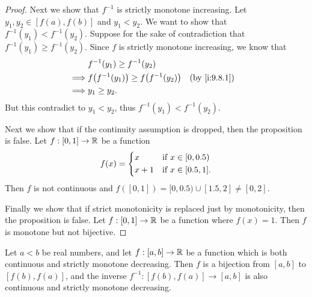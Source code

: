 \begin{proof}
  Next we show that \(f^{-1}\) is strictly monotone increasing.
  Let \(y_1, y_2 \in [f(a), f(b)]\) and \(y_1 < y_2\).
  We want to show that \(f^{-1}(y_1) < f^{-1}(y_2)\).
  Suppose for the sake of contradiction that \(f^{-1}(y_1) \geq f^{-1}(y_2)\).
  Since \(f\) is strictly monotone increasing, we know that
  \begin{align*}
             & f^{-1}(y_1) \geq f^{-1}(y_2)                                         \\
    \implies & f\big(f^{-1}(y_1)\big) \geq f\big(f^{-1}(y_2)\big) &  & \by{i:9.8.1} \\
    \implies & y_1 \geq y_2.
  \end{align*}
  But this contradict to \(y_1 < y_2\), thus \(f^{-1}(y_1) < f^{-1}(y_2)\).

  Next we show that if the continuity assumption is dropped, then the proposition is false.
  Let \(f : [0, 1] \to \mathbb{R}\) be a function
  \[
    f(x) = \begin{dcases}
      x     & \text{if } x \in [0, 0.5)  \\
      x + 1 & \text{if } x \in [0.5, 1].
    \end{dcases}
  \]
  Then \(f\) is not continuous and \(f([0, 1]) = [0, 0.5) \cup [1.5, 2] \neq [0, 2]\).

  Finally we show that if strict monotonicity is replaced just by monotonicity, then the proposition is false.
  Let \(f : [0, 1] \to \mathbb{R}\) be a function where \(f(x) = 1\).
  Then \(f\) is monotone but not bijective.
\end{proof}

\begin{ac}\label{i:ac:9.8.1}
  Let \(a < b\) be real numbers, and let \(f : [a, b] \to \mathbb{R}\) be a function which is both continuous and strictly monotone decreasing.
  Then \(f\) is a bijection from \([a, b]\) to \([f(b), f(a)]\), and the inverse \(f^{-1} : [f(b), f(a)] \to [a, b]\) is also continuous and strictly monotone decreasing.
\end{ac}


